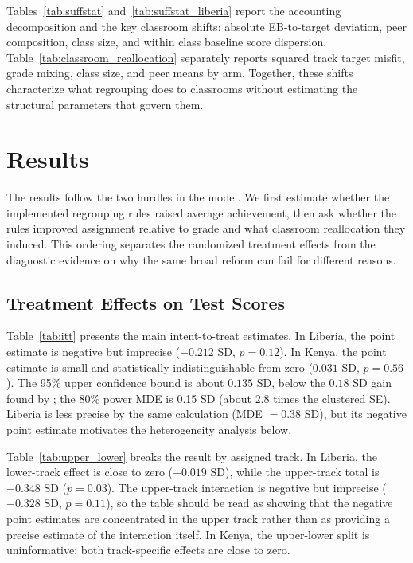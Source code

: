 \documentclass[11pt]{article}
\begin{document}
Tables~\ref{tab:suffstat} and~\ref{tab:suffstat_liberia} report the accounting decomposition and the key classroom shifts: absolute EB-to-target deviation, peer composition, class size, and within class baseline score dispersion. Table~\ref{tab:classroom_reallocation} separately reports squared track target misfit, grade mixing, class size, and peer means by arm. Together, these shifts characterize what regrouping does to classrooms without estimating the structural parameters that govern them.

\section{Results}
\label{sec:results}

The results follow the two hurdles in the model. We first estimate whether the implemented regrouping rules raised average achievement, then ask whether the rules improved assignment relative to grade and what classroom reallocation they induced. This ordering separates the randomized treatment effects from the diagnostic evidence on why the same broad reform can fail for different reasons.

\subsection{Treatment Effects on Test Scores}

Table~\ref{tab:itt} presents the main intent-to-treat estimates. In Liberia, the point estimate is negative but imprecise ($-0.212$ SD, $p = 0.12$). In Kenya, the point estimate is small and statistically indistinguishable from zero ($0.031$ SD, $p = 0.56$). The 95\% upper confidence bound is about $0.135$ SD, below the $0.18$ SD gain found by \citet{duflo2011peer}; the 80\% power MDE is 0.15 SD (about $2.8$ times the clustered SE). Liberia is less precise by the same calculation (MDE $= 0.38$ SD), but its negative point estimate motivates the heterogeneity analysis below.

Table~\ref{tab:upper_lower} breaks the result by assigned track. In Liberia, the lower-track effect is close to zero ($-0.019$ SD), while the upper-track total is $-0.348$ SD ($p = 0.03$). The upper-track interaction is negative but imprecise ($-0.328$ SD, $p = 0.11$), so the table should be read as showing that the negative point estimates are concentrated in the upper track rather than as providing a precise estimate of the interaction itself. In Kenya, the upper-lower split is uninformative: both track-specific effects are close to zero.
\end{document}
